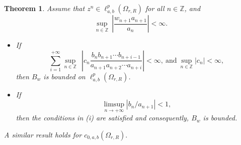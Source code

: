 \documentclass[12pt, reqno]{amsart}
\newtheorem{theorem}{Theorem}[section]
\theoremstyle{definition}
\theoremstyle{remark}
\numberwithin{equation}{section}
\begin{document}
   \begin{theorem}\label{decomposition1}
  Assume that $z^n\in \ell^p_{a,b}(\Omega_{r,R})$ for all $n\in \mathbb{Z}$, and 
  \begin{equation}\label{rr}
  \sup_{n\in \mathbb{Z}}~\left\lvert\frac{ w_{n+1}a_{n+1}}{a_{n}}\right\rvert<\infty.
  \end{equation}
  \begin{itemize}
  \item[(i)] If 
  \begin{equation}\label{ss}
  \sum_{i=1}^{+\infty}\sup_{n\in \mathbb{Z}}~~\left\lvert c_{n}\frac{b_{n}b_{n+1}\cdots b_{n+i-1}}{a_{n+1}a_{n+2}\cdots a_{n+i}}\right\rvert<\infty, ~\text{and}~ \sup_{n\in \mathbb{Z}}|c_n|<\infty,
  \end{equation}
  then $B_{w}$ is bounded on $\ell^{p}_{a,b}(\Omega_{r,R})$.
\item[(ii)] If 
\begin{equation}\label{tt}
\limsup_{ n\rightarrow +\infty} \left\lvert b_n/a_{n+1}\right\rvert<1,
\end{equation}
then the conditions in \textnormal{(i)} are satisfied and consequently, $B_w$ is bounded.
   \end{itemize}
   A similar result holds for $c_{0,a,b}(\Omega_{r,R}).$
   \end{theorem}
\end{document}
